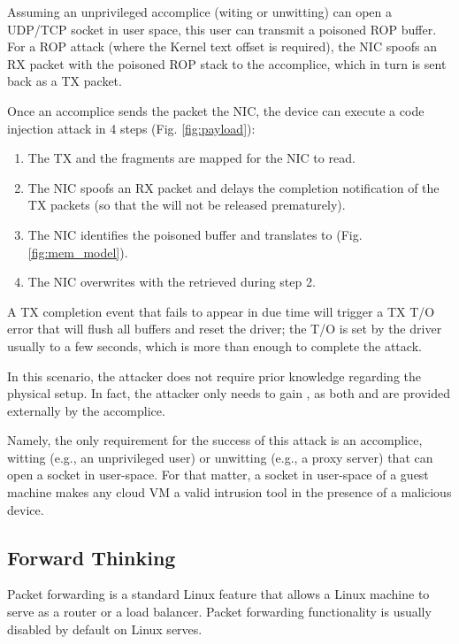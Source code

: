 Assuming an unprivileged accomplice (witing or unwitting) can open a UDP/TCP socket in user space, this user can transmit a poisoned ROP buffer. For a ROP attack (where the Kernel text offset is required), the NIC spoofs an RX packet with the poisoned ROP stack to the accomplice, which in turn is sent back as a TX packet. 

Once an accomplice sends the packet the NIC, the device can execute a code injection attack in 4 steps (Fig. \ref{fig:payload}):
\begin{enumerate}
    \item The TX \data{} and the fragments are mapped for the NIC to read.
    \item The NIC spoofs an RX packet and delays the completion notification of the TX packets (so that the \mabaf{} will not be released prematurely).
    \item The NIC identifies the poisoned buffer and translates \page{} to \kva{} (Fig. \ref{fig:mem_model}).
    \item The NIC overwrites \shinfo{} with the \kva{} retrieved during step 2. 
\end{enumerate}

A TX completion event that fails to appear in due time will trigger a TX T/O error that will flush all buffers and reset the driver; the T/O is set by the driver usually to a few seconds, which is more than enough to complete the attack.
 
In this scenario, the attacker does not require prior knowledge regarding the physical setup. In fact, the attacker only needs to gain \oportunity{}, as both \means{} and \oportunity{} are provided externally by the accomplice. 

Namely, the only requirement for the success of this attack is an accomplice, witting (e.g., an unprivileged user) or unwitting (e.g., a proxy server) that can open a socket in user-space. For that matter, a socket in user-space of a guest machine makes any cloud VM a valid intrusion tool in the presence of a malicious device.

\subsection{Forward Thinking}\label{sec:forward}

Packet forwarding is a standard Linux feature that allows a Linux machine to serve as a router or a load balancer. Packet forwarding functionality is usually disabled by default on Linux serves.


